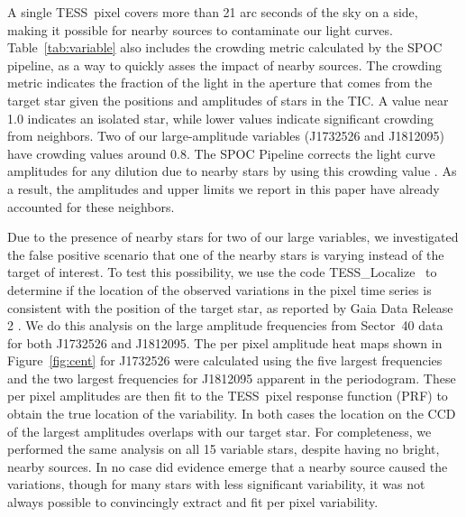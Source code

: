 \documentclass[twocolumn]{aastex631}
\newcommand{\tess}{TESS}
\newcommand{\tesslocalize}{{{\fontfamily{lmtt}\selectfont TESS\_Localize}}}
\begin{document}
A single \tess\ pixel covers more than 21 arc seconds of the sky on a side, making it possible for nearby sources to contaminate our light curves. Table~\ref{tab:variable} also includes the crowding metric calculated by the SPOC pipeline, as a way to quickly asses the impact of nearby sources. The crowding metric indicates the fraction of the light in the aperture that comes from the target star given the positions and amplitudes of stars in the TIC.  A value near 1.0 indicates an isolated star, while lower values indicate significant crowding from neighbors.  Two of our large-amplitude variables (J1732526 and J1812095) have crowding values around 0.8.  The SPOC Pipeline corrects the light curve amplitudes for any dilution due to nearby stars by using this crowding value \citep{FausnaughDRN}.  As a result, the amplitudes and upper limits we report in this paper have already accounted for these neighbors.


Due to the presence of nearby stars for two of our large variables, we investigated the false positive scenario that one of the nearby stars is varying instead of the target of interest. To test this possibility, we use the code \tesslocalize\ \citep{HiggensBell} to determine if the location of the observed variations in the pixel time series is consistent with the position of the target star, as reported by Gaia Data Release 2 \citep{gaiaDR22018}.  We do this analysis on the large amplitude frequencies from Sector~40 data for both J1732526 and J1812095. The per pixel amplitude heat maps shown in Figure~\ref{fig:cent} for J1732526 were calculated using the five largest frequencies and the two largest frequencies for J1812095 apparent in the periodogram.  These per pixel amplitudes are then fit to the \tess\ pixel response function (PRF) to obtain the true location of the variability. In both cases the location on the CCD of the largest amplitudes overlaps with our target star.  For completeness, we performed the same analysis on all 15 variable stars, despite having no bright, nearby sources. In no case did evidence emerge that a nearby source caused the variations, though for many stars with less significant variability, it was not always possible to convincingly extract and fit per pixel variability.



\vspace{-1em}
\end{document}
